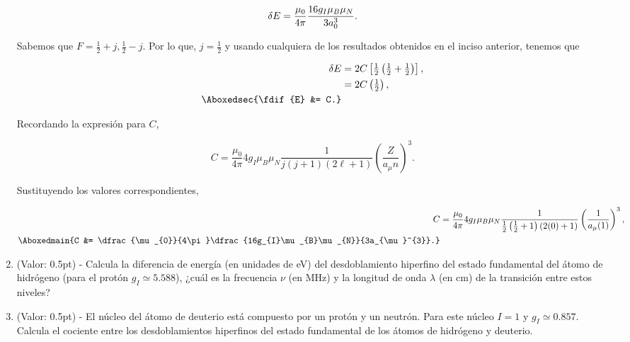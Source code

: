 \documentclass[./../main.tex]{subfiles}
\begin{document}
\begin{exercise}
\begin{enumerate}
            \begin{equation*}
                \fdif{E} = \dfrac{\mu_{0}}{4\pi}\dfrac{16g_{I}\mu_{B}\mu_{N}}{3a_{0}^{3}}.
            \end{equation*}

            \begin{solution}
                Sabemos que \(F = \tfrac{1}{2} + j, \tfrac{1}{2} - j\). Por lo que, \(j = \tfrac{1}{2}\) y usando cualquiera de los resultados obtenidos en el inciso anterior, tenemos que

                \begin{align*}
                    \fdif{E} &= 2C\left[\tfrac{1}{2}\left(\tfrac{1}{2} + \tfrac{1}{2}\right)\right],\\
                    &= 2C\left(\tfrac{1}{2}\right),\\
                    \Aboxedsec{\fdif{E} &= C.}
                \end{align*}

                Recordando la expresión para \(C\),

                \begin{equation*}
                    C = \dfrac{\mu_{0}}{4\pi}4g_{I}\mu_{B}\mu_{N}\dfrac{1}{j(j + 1)(2\ell + 1)}\left(\dfrac{Z}{a_{\mu}n}\right)^{3}.
                \end{equation*}

                Sustituyendo los valores correspondientes,

                \begin{align*}
                    C &= \dfrac{\mu_{0}}{4\pi}4g_{I}\mu_{B}\mu_{N}\dfrac{1}{\tfrac{1}{2}\left(\tfrac{1}{2} + 1\right)\left(2(0) + 1\right)}\left(\dfrac{1}{a_{\mu}(1)}\right)^{3},\\
                    \Aboxedmain{C &= \dfrac{\mu_{0}}{4\pi}\dfrac{16g_{I}\mu_{B}\mu_{N}}{3a_{\mu}^{3}}.}
                \end{align*}
            \end{solution}

            \item (Valor: 0.5pt) - Calcula la diferencia de energía (en unidades de \unit{\eV}) del desdoblamiento hiperfino del estado fundamental del átomo de hidrógeno (para el protón \(g_{I} \simeq \num{5.588}\)), ¿cuál es la frecuencia \(\nu\) (en \unit{\MHz}) y la longitud de onda \(\lambda\) (en \unit{\cm}) de la transición entre estos niveles?
            
            \item (Valor: 0.5pt) - El núcleo del átomo de deuterio está compuesto por un protón y un neutrón. Para este núcleo \(I = 1\) y \(g_{I} \simeq \num{0.857}\). Calcula el cociente entre los desdoblamientos hiperfinos del estado fundamental de los átomos de hidrógeno y deuterio.
        \end{enumerate}
    \end{exercise}
\end{document}
